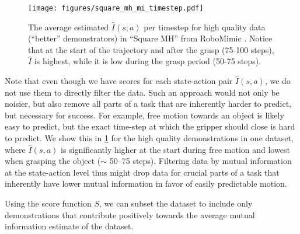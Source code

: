\begin{figure}
    \centering
    \texttt{[image: figures/square\_mh\_mi\_timestep.pdf]}
    \vspace{-0.1in}
    \caption{The average estimated $\hat{I}(s;a)$ per timestep for high quality data (``better'' demonstrators) in ``Square MH'' from RoboMimic \citep{robomimic}. Notice that at the start of the trajectory and after the grasp (75-100 steps), $\hat{I}$ is highest, while it is low during the grasp period (50-75 steps).}
    \label{fig:per_timestep}
\end{figure}

Note that even though we have scores for each state-action pair $\hat{I}(s, a)$, we do not use them to directly filter the data. Such an approach would not only be noisier, but also remove all parts of a task that are inherently harder to predict, but necessary for success. For example, free motion towards an object is likely easy to predict, but the exact time-step at which the gripper should close is hard to predict. We show this in \cref{fig:per_timestep} for the high quality demonstrations in one dataset, where $\hat{I}(s, a)$ is significantly higher at the start during free motion and lowest when grasping the object ($\sim$ 50--75 steps). Filtering data by mutual information at the state-action level thus might drop data for crucial parts of a task that inherently have lower mutual information in favor of easily predictable motion. 


Using the score function $S$, we can subset the dataset to include only demonstrations that contribute positively towards the average mutual information estimate of the dataset.
